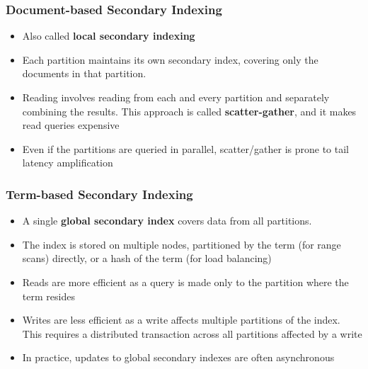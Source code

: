 \documentclass{article}
\begin{document}
\subsubsection{Document-based Secondary Indexing}
\begin{itemize}
    \item Also called \textbf{local secondary indexing}
    
    \item Each partition maintains its own secondary index, covering only the documents in that partition. 
    
    \item Reading involves reading from each and every partition and separately combining the results. This approach is called \textbf{scatter-gather}, and it makes read queries expensive
    
    \item Even if the partitions are queried in parallel, scatter/gather is prone to tail latency amplification
\end{itemize}

\subsubsection{Term-based Secondary Indexing}
\begin{itemize}
    \item A single \textbf{global secondary index} covers data from all partitions. 
    
    \item The index is stored on multiple nodes, partitioned by the term (for range scans) directly, or a hash of the term (for load balancing)
    
    \item Reads are more efficient as a query is made only to the partition where the term resides
    
    \item Writes are less efficient as a write affects multiple partitions of the index. This requires a distributed transaction across all partitions affected by a write
    
    \item In practice, updates to global secondary indexes are often asynchronous
\end{itemize}
\end{document}
